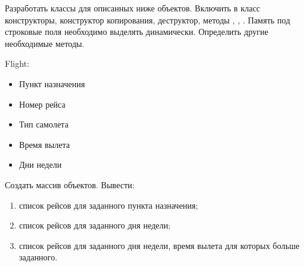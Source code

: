 
Разработать классы для описанных ниже объектов. Включить в класс
конструкторы, конструктор копирования, деструктор, методы ,
, . Память под строковые поля необходимо выделять
динамически. Определить другие необходимые методы.

Flight:
\begin{itemize}
	\item Пункт назначения
	\item Номер рейса
	\item Тип самолета
	\item Время вылета
	\item Дни недели
\end{itemize}

Создать массив объектов. Вывести:
\begin{enumerate}
	\item список рейсов для заданного пункта назначения;
	\item список рейсов для заданного дня недели;
	\item список рейсов для заданного дня недели, время вылета для которых
		больше заданного.
\end{enumerate}
